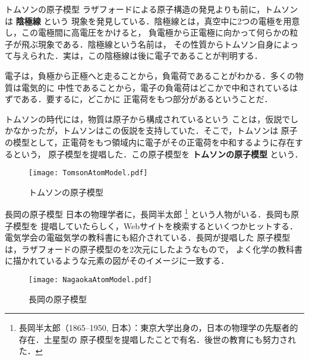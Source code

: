         \begin{memo}{トムソンの原子模型}
            ラザフォードによる原子構造の発見よりも前に，トムソンは \textbf{陰極線} という
            現象を発見している．陰極線とは，真空中に2つの電極を用意し，この電極間に高電圧をかけると，
            負電極から正電極に向かって何らかの粒子が飛ぶ現象である．陰極線という名前は，
            その性質からトムソン自身によって与えられた．実は，この陰極線は後に電子であることが判明する．

            電子は，負極から正極へと走ることから，負電荷であることがわかる．多くの物質は電気的に
            中性であることから，電子の負電荷はどこかで中和されているはずである．要するに，どこかに
            正電荷をもつ部分があるということだ．

            トムソンの時代には，物質は原子から構成されているという
            ことは，仮説でしかなかったが，トムソンはこの仮説を支持していた．そこで，トムソンは
            原子の模型として，正電荷をもつ領域内に電子がその正電荷を中和するように存在するという，
            原子模型を提唱した．この原子模型を \textbf{トムソンの原子模型} という．
                \begin{figure}[hbt]
                    \begin{center}
                        \texttt{[image: TomsonAtomModel.pdf]}
                        \caption{トムソンの原子模型}
                        \label{fig:TomsonAtomModel}
                    \end{center}
                \end{figure}
        \end{memo}

        \begin{memo}{長岡の原子模型}
            日本の物理学者に，長岡半太郎
                \footnote{
                    長岡半太郎（1865--1950, 日本）：東京大学出身の，日本の物理学の先駆者的存在．土星型の
                    原子模型を提唱したことで有名．後世の教育にも努力された．
                }
            という人物がいる．長岡も原子模型を
            提唱していたらしく，Webサイトを検索するといくつかヒットする．
            電気学会の電磁気学の教科書にも紹介されている．長岡が提唱した
            原子模型は，ラザフォードの原子模型のを2次元にしたようなもので，
            よく化学の教科書に描かれているような元素の図がそのイメージに一致する．
                \begin{figure}[hbt]
                    \begin{center}
                        \texttt{[image: NagaokaAtomModel.pdf]}
                        \caption{長岡の原子模型}
                        \label{fig:NagaokaAtomModel}
                    \end{center}
                \end{figure}
        \end{memo}



